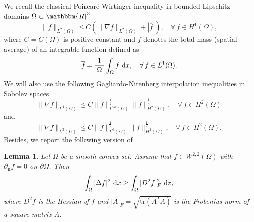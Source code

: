 \documentclass[11pt,  reqno]{amsart}%
\theoremstyle{plain}
\newtheorem{lemma}[theorem]{Lemma}
\theoremstyle{definition}
\theoremstyle{remark}
\numberwithin{equation}{section}
\newcommand{\dx}{\textup{d}x}
\begin{document}
We recall the classical Poincar\'{e}-Wirtinger inequality in bounded Lipschitz domains $\Omega \subset \mathbbm{R}^3$
\begin{equation}
    \label{PI}
    \|f \|_{L^2(\Omega)} \le C \left( \|\nabla f\|_{L^2(\Omega)} + |\overline{f}| \right)\!, \quad \forall \, f \in H^1(\Omega),
\end{equation}
where $C=C(\Omega)$ is positive constant and $\overline{f}$ denotes the total mass (spatial average) of an integrable function defined as
$$
\overline{f}= \frac{1}{|\Omega|} \int_\Omega f \ \dx, \quad \forall \, f \in L^1(\Omega).
$$
We will also use the following Gagliardo-Nirenberg interpolation inequalities in Sobolev spaces 
\begin{equation}
    \label{GNI L4}
    \|\nabla f \|_{L^4(\Omega)}\le C \|f\|_{L^\infty(\Omega)}^{\frac12}\|f\|_{H^2(\Omega)}^{\frac12}, \quad \forall \, f \in H^2(\Omega)
\end{equation}
and
\begin{equation}
    \label{GNI L3}
    \|\nabla f \|_{L^3(\Omega)}\le C \|f\|_{L^6(\Omega)}^{\frac12}\|f\|_{H^2(\Omega)}^{\frac12},  \quad \forall \, f \in H^2(\Omega).
\end{equation} 
Besides, we report the following version of \cite[Lemma 5.1]{GST2009}.
\begin{lemma}
\label{lemma H2}
    Let $\Omega$ be a smooth convex set. Assume that
    $f \in W^{2,2}(\Omega)$ with $\partial_{\mathbf{n}} f=0$ on $\partial \Omega$. Then
    $$
    \int_\Omega |\Delta f|^2 \ \dx \ge \int_\Omega |D^2 f |_F^2 \ \dx,
    $$
where $D^2 f$ is the Hessian of $f$ and $|A|_F= \sqrt{\textrm{tr}(A^TA)}$ is the Frobenius norm of a square matrix $A$. 
\end{lemma}
\end{document}
